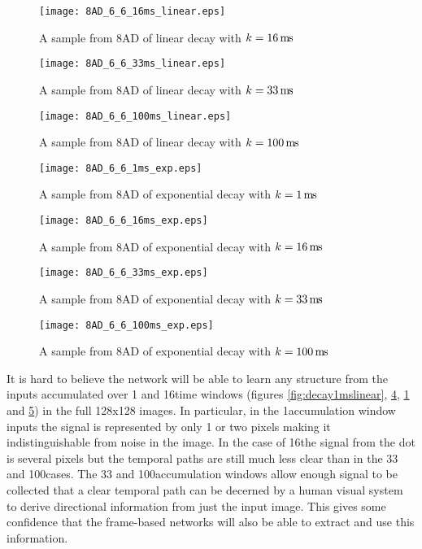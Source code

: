 \begin{figure}[h]
    \centering
    \texttt{[image: 8AD\_6\_6\_16ms\_linear.eps]}
    \caption{A sample from 8AD of linear decay with $k=16\rm\,m\hspace{-0.08em} s$}
    \label{fig:decay16mslinear}
\end{figure}

\begin{figure}[h]
    \centering
    \texttt{[image: 8AD\_6\_6\_33ms\_linear.eps]}
    \caption{A sample from 8AD of linear decay with $k=33\rm\,m\hspace{-0.08em} s$}
    \label{fig:decay33mslinear}
\end{figure}

\begin{figure}[h]
    \centering
    \texttt{[image: 8AD\_6\_6\_100ms\_linear.eps]}
    \caption{A sample from 8AD of linear decay with $k=100\rm\,m\hspace{-0.08em} s$}
    \label{fig:decay100mslinear}
\end{figure}

\begin{figure}[h]
    \centering
    \texttt{[image: 8AD\_6\_6\_1ms\_exp.eps]}
    \caption{A sample from 8AD of exponential decay with $k=1\rm\,m\hspace{-0.08em} s$}
    \label{fig:decay1msexp}
\end{figure}


\begin{figure}[h]
    \centering
    \texttt{[image: 8AD\_6\_6\_16ms\_exp.eps]}
    \caption{A sample from 8AD of exponential decay with $k=16\rm\,m\hspace{-0.08em} s$}
    \label{fig:decay16msexp}
\end{figure}



\begin{figure}[h]
    \centering
    \texttt{[image: 8AD\_6\_6\_33ms\_exp.eps]}
    \caption{A sample from 8AD of exponential decay with $k=33\rm\,m\hspace{-0.08em} s$}
    \label{fig:decay33msexp}
\end{figure}

\begin{figure}[h]
    \centering
    \texttt{[image: 8AD\_6\_6\_100ms\_exp.eps]}
    \caption{A sample from 8AD of exponential decay with $k=100\rm\,m\hspace{-0.08em} s$}
    \label{fig:decay100msexp}
\end{figure}

It is hard to believe the network will be able to learn any structure from the inputs accumulated over 1 and 16\ms time windows (figures \ref{fig:decay1mslinear}, \ref{fig:decay1msexp}, \ref{fig:decay16mslinear} and \ref{fig:decay16msexp}) in the full 128x128 images.
In particular, in the 1\ms accumulation window inputs the signal is represented by only 1 or two pixels making it indistinguishable from noise in the image. 
In the case of 16\ms the signal from the dot is several pixels but the temporal paths are still much less clear than in the 33 and 100\ms cases.
The 33 and 100\ms accumulation windows allow enough signal to be collected that a clear temporal path can be decerned by a human visual system to derive directional information from just the input image.
This gives some confidence that the frame-based networks will also be able to extract and use this information.

